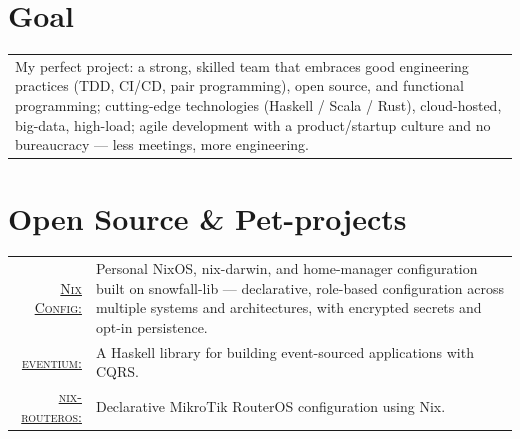 \documentclass[a4paper,11pt]{article}
\begin{document}
\section{Goal}
\begin{tabular}{p{}}
My perfect project: a strong, skilled team that embraces good engineering practices (TDD, CI/CD, pair programming), open source, and functional programming; cutting-edge technologies (Haskell / Scala / Rust), cloud-hosted, big-data, high-load; agile development with a product/startup culture and no bureaucracy --- less meetings, more engineering.
\end{tabular}

\section{Open Source \& Pet-projects}
\begin{tabular}{rp{}}
  \href{https://github.com/aleks-sidorenko/nix-config}{\textsc{Nix Config}:}  & Personal NixOS, nix-darwin, and home-manager configuration built on snowfall-lib --- declarative, role-based configuration across multiple systems and architectures, with encrypted secrets and opt-in persistence.\\[0.4em]
  \href{https://github.com/aleks-sidorenko/eventium}{\textsc{eventium}:}    & A Haskell library for building event-sourced applications with CQRS.\\[0.4em]
  \href{https://github.com/aleks-sidorenko/nix-routeros}{\textsc{nix-routeros}:}& Declarative MikroTik RouterOS configuration using Nix.\\
\end{tabular}
\end{document}
